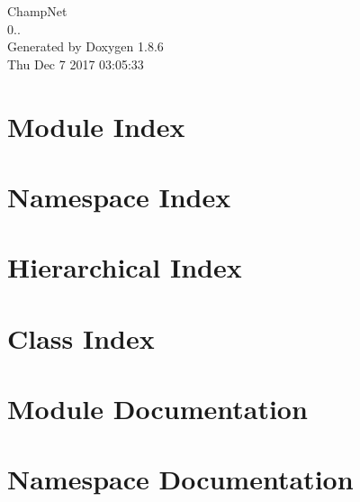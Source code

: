 \documentclass[twoside]{book}
\newcommand{\clearemptydoublepage}{%
  \newpage{\pagestyle{empty}\cleardoublepage}%
}
\begin{document}
\hypersetup{pageanchor=false}
\begin{titlepage}
\vspace*{7cm}
\begin{center}%
{\Large Champ\-Net \\[1ex]\large 0.. }\\
\vspace*{1cm}
{\large Generated by Doxygen 1.8.6}\\
\vspace*{0.5cm}
{\small Thu Dec 7 2017 03:05:33}\\
\end{center}
\end{titlepage}
\clearemptydoublepage
\tableofcontents
\clearemptydoublepage
{}
\hypersetup{pageanchor=true}

\chapter{Module Index}

\chapter{Namespace Index}

\chapter{Hierarchical Index}

\chapter{Class Index}

\chapter{Module Documentation}




\chapter{Namespace Documentation}


\end{document}

